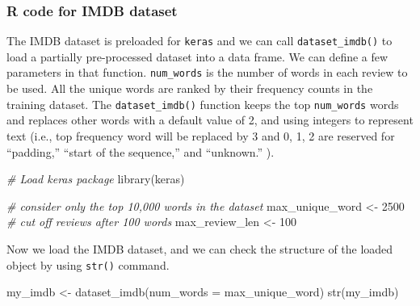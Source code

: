 \documentclass[
  12pt,
]{krantz}
\makeatletter
\newenvironment{Shaded}{\begin{snugshade}}{\end{snugshade}}
\newcommand{\AttributeTok}[1]{\textcolor[rgb]{0.61,0.61,0.61}{#1}}
\newcommand{\CommentTok}[1]{\textcolor[rgb]{0.37,0.37,0.37}{\textit{#1}}}
\newcommand{\DecValTok}[1]{\textcolor[rgb]{0.06,0.06,0.06}{#1}}
\newcommand{\FunctionTok}[1]{\textcolor[rgb]{0,0,0}{#1}}
\newcommand{\NormalTok}[1]{#1}
\newcommand{\OtherTok}[1]{\textcolor[rgb]{0.37,0.37,0.37}{#1}}
\newenvironment{kframe}{%
\medskip{}
\setlength{\fboxsep}{.8em}
 \def\at@end@of@kframe{}%
 \ifinner\ifhmode%
  \def\at@end@of@kframe{\end{minipage}}%
  \begin{minipage}{\columnwidth}%
 \fi\fi%
 \def\FrameCommand##1{\hskip\@totalleftmargin \hskip-\fboxsep
 \colorbox{shadecolor}{##1}\hskip-\fboxsep
     \hskip-\linewidth \hskip-\@totalleftmargin \hskip\columnwidth}%
 \MakeFramed {\advance\hsize-\width
   \@totalleftmargin\z@ \linewidth\hsize
   \@setminipage}}%
 {\par\unskip\endMakeFramed%
 \at@end@of@kframe}
\renewenvironment{Shaded}{\begin{kframe}}{\end{kframe}}
\makeatother
\begin{document}
\hypertarget{r-code-for-imdb-dataset}{%
\subsubsection{R code for IMDB dataset}\label{r-code-for-imdb-dataset}}

The IMDB dataset is preloaded for \texttt{keras} and we can call \texttt{dataset\_imdb()} to load a partially pre-processed dataset into a data frame. We can define a few parameters in that function. \texttt{num\_words} is the number of words in each review to be used. All the unique words are ranked by their frequency counts in the training dataset. The \texttt{dataset\_imdb()} function keeps the top \texttt{num\_words} words and replaces other words with a default value of 2, and using integers to represent text (i.e., top frequency word will be replaced by 3 and 0, 1, 2 are reserved for ``padding,'' ``start of the sequence,'' and ``unknown.'' ).

\begin{Shaded}
\begin{Highlighting}[]
\CommentTok{\# Load \textasciigrave{}keras\textasciigrave{} package}
\FunctionTok{library}\NormalTok{(keras)}

\CommentTok{\# consider only the top 10,000 words in the dataset}
\NormalTok{max\_unique\_word }\OtherTok{\textless{}{-}} \DecValTok{2500}
\CommentTok{\# cut off reviews after 100 words}
\NormalTok{max\_review\_len }\OtherTok{\textless{}{-}} \DecValTok{100}
\end{Highlighting}
\end{Shaded}

Now we load the IMDB dataset, and we can check the structure of the loaded object by using \texttt{str()} command.

\begin{Shaded}
\begin{Highlighting}[]
\NormalTok{my\_imdb }\OtherTok{\textless{}{-}} \FunctionTok{dataset\_imdb}\NormalTok{(}\AttributeTok{num\_words =}\NormalTok{ max\_unique\_word)}
\FunctionTok{str}\NormalTok{(my\_imdb)}
\end{Highlighting}
\end{Shaded}
\end{document}
